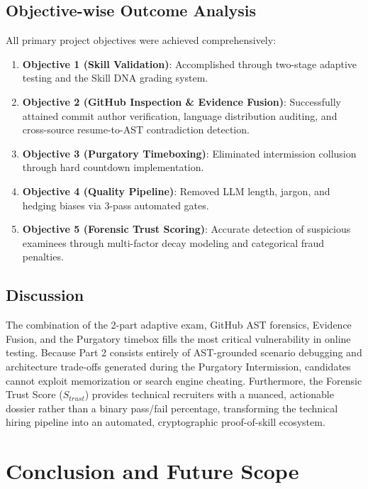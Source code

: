 \section{Objective-wise Outcome Analysis}
All primary project objectives were achieved comprehensively:
\begin{enumerate}
    \item \textbf{Objective 1 (Skill Validation)}: Accomplished through two-stage adaptive testing and the Skill DNA grading system.
    \item \textbf{Objective 2 (GitHub Inspection \& Evidence Fusion)}: Successfully attained commit author verification, language distribution auditing, and cross-source resume-to-AST contradiction detection.
    \item \textbf{Objective 3 (Purgatory Timeboxing)}: Eliminated intermission collusion through hard countdown implementation.
    \item \textbf{Objective 4 (Quality Pipeline)}: Removed LLM length, jargon, and hedging biases via 3-pass automated gates.
    \item \textbf{Objective 5 (Forensic Trust Scoring)}: Accurate detection of suspicious examinees through multi-factor decay modeling and categorical fraud penalties.
\end{enumerate}

\section{Discussion}
The combination of the 2-part adaptive exam, GitHub AST forensics, Evidence Fusion, and the Purgatory timebox fills the most critical vulnerability in online testing. Because Part 2 consists entirely of AST-grounded scenario debugging and architecture trade-offs generated during the Purgatory Intermission, candidates cannot exploit memorization or search engine cheating. Furthermore, the Forensic Trust Score ($S_{trust}$) provides technical recruiters with a nuanced, actionable dossier rather than a binary pass/fail percentage, transforming the technical hiring pipeline into an automated, cryptographic proof-of-skill ecosystem.

\clearpage


\chapter{Conclusion and Future Scope}

